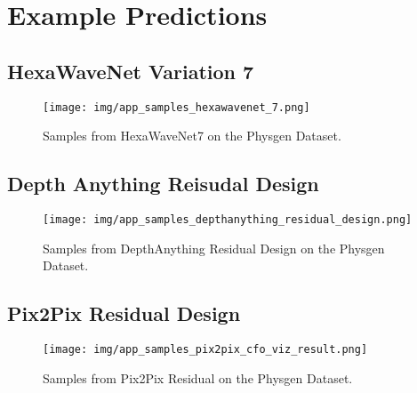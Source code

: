 \chapter{Example Predictions}
\label{appendix:example-predictions}

	

	\section{HexaWaveNet Variation 7}
	
		\begin{figure}[H]
			\centering
			\texttt{[image: img/app\_samples\_hexawavenet\_7.png]}
			\caption[Samples from HexaWaveNet7 on the Physgen Dataset.]{Samples from HexaWaveNet7 on the Physgen Dataset.}
		\end{figure}
		\FloatBarrier

	\section{Depth Anything Reisudal Design}
	
	\begin{figure}[H]
		\centering
		\texttt{[image: img/app\_samples\_depthanything\_residual\_design.png]}
		\caption[Samples from DepthAnything Residual Design on the Physgen Dataset.]{Samples from DepthAnything Residual Design on the Physgen Dataset.}
	\end{figure}
	\FloatBarrier
		
	\section{Pix2Pix Residual Design}
	
		\begin{figure}[H]
			\centering
			\texttt{[image: img/app\_samples\_pix2pix\_cfo\_viz\_result.png]}
			\caption[Samples from Pix2Pix Residual on the Physgen Dataset.]{Samples from Pix2Pix Residual on the Physgen Dataset.}
		\end{figure}
		\FloatBarrier
		
